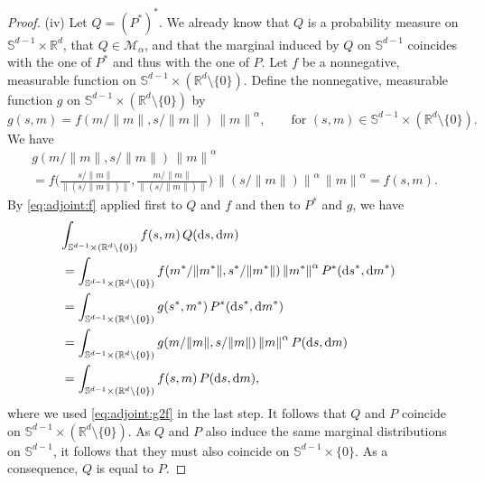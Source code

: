 \documentclass{aptpubarxiv}
\numberwithin{equation}{section}
\begin{document}
\begin{proof}
(iv) Let $Q = (P^*)^*$. We already know that $Q$ is a probability measure on $\mathbb{S}^{d-1} \times {\mathbb{R}}^d$, that $Q \in \mathcal{M}_\alpha$, and that the marginal induced by $Q$ on $\mathbb{S}^{d-1}$ coincides with the one of $P^*$ and thus with the one of $P$. Let $f$ be a nonnegative, measurable function on $\mathbb{S}^{d-1} \times ({\mathbb{R}}^d \setminus\{ 0 \})$. Define the nonnegative, measurable function $g$ on $\mathbb{S}^{d-1} \times ({\mathbb{R}}^d \setminus \{ 0 \})$ by
\[
  g( s, m ) = f( m / {\|{m}\|}, s / {\|{m}\|} ) \, {\|{m}\|}^\alpha, \qquad \text{for $(s, m) \in \mathbb{S}^{d-1} \times ({\mathbb{R}}^d\setminus\{0\})$}.
\]
We have
\begin{multline}
\label{eq:adjoint:g2f}
  g( m / {\|{m}\|}, s / {\|{m}\|} ) \, {\|{m}\|}^\alpha \\
  = f\biggl( \frac{s / {\|{m}\|}}{{\|{(s / {\|{m}\|})}\|}}, \frac{m / {\|{m}\|}}{{\|{(s / {\|{m}\|})}\|}} \biggr) \, {\|{(s / {\|{m}\|})}\|}^\alpha \, {\|{m}\|}^\alpha
  = f(s, m).
\end{multline}
By \eqref{eq:adjoint:f} applied first to $Q$ and $f$ and then to $P^*$ and $g$, we have
\begin{align*}
  \lefteqn{
  \int_{ \mathbb{S}^{d-1} \times ({\mathbb{R}}^d \setminus \{ 0 \}) } f( s, m ) \, Q({\mathrm{d}s}, {\mathrm{d}m})
  } \\
  &= \int_{ \mathbb{S}^{d-1} \times ({\mathbb{R}}^d \setminus \{ 0 \}) } f( m^* / {\|{m^*}\|}, s^* / {\|{m^*}\|} ) \, {\|{m^*}\|}^\alpha \, P^*({\mathrm{d}s}^*, {\mathrm{d}m}^*) \\
  &= \int_{ \mathbb{S}^{d-1} \times ({\mathbb{R}}^d \setminus \{ 0 \}) } g( s^*, m^* ) \, P^*({\mathrm{d}s}^*, {\mathrm{d}m}^*) \\
  &= \int_{ \mathbb{S}^{d-1} \times ({\mathbb{R}}^d \setminus \{ 0 \}) } g( m / {\|{m}\|}, s / {\|{m}\|} ) \, {\|{m}\|}^\alpha \, P({\mathrm{d}s}, {\mathrm{d}m}) \\
  &= \int_{ \mathbb{S}^{d-1} \times ({\mathbb{R}}^d \setminus \{ 0 \}) } f(s, m) \, P({\mathrm{d}s}, {\mathrm{d}m}),
\end{align*}
where we used \eqref{eq:adjoint:g2f} in the last step. It follows that $Q$ and $P$ coincide on $\mathbb{S}^{d-1} \times ({\mathbb{R}}^d \setminus \{ 0 \})$. As $Q$ and $P$ also induce the same marginal distributions on $\mathbb{S}^{d-1}$, it follows that they must also coincide on $\mathbb{S}^{d-1} \times \{ 0 \}$. As a consequence, $Q$ is equal to $P$.
\end{proof} 
\end{document}
